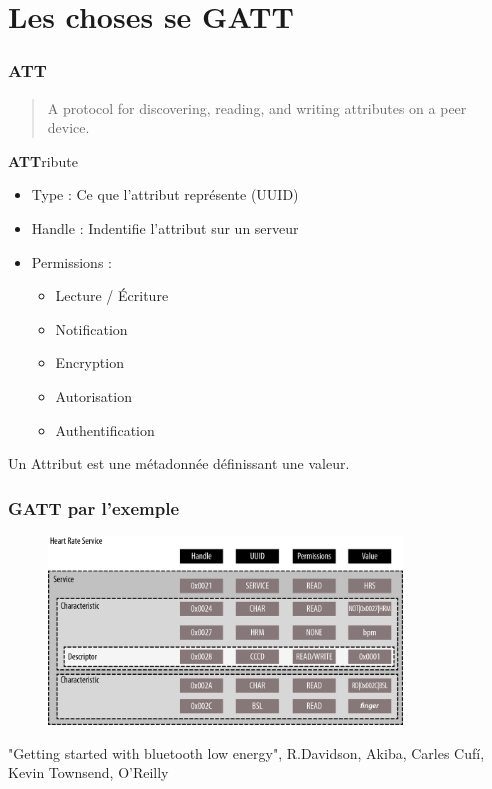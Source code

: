 \section{Les choses se GATT}
\begin{frame}
	\frametitle{ATT}
	\begin{quote}A protocol for discovering, reading, and writing attributes on a peer device.\end{quote}

	\begin{block}{\textbf{ATT}ribute}
		\begin{itemize}
			\item Type : Ce que l'attribut représente (UUID)
			\item Handle : Indentifie l'attribut sur un serveur
			\item Permissions :
				\begin{itemize}
					\item Lecture / Écriture
					\item Notification
					\item Encryption
					\item Autorisation
					\item Authentification
				\end{itemize}
		\end{itemize}
	\end{block}
	Un Attribut est une métadonnée définissant une valeur.
\end{frame}

\begin{frame}
	\frametitle{GATT par l'exemple}
	\begin{figure}
		\includegraphics[height=5cm]{img/gatt.png}
	\end{figure}
{\tiny "Getting started with bluetooth low energy", R.Davidson, Akiba, Carles Cufí, Kevin Townsend, O'Reilly}

\end{frame}

